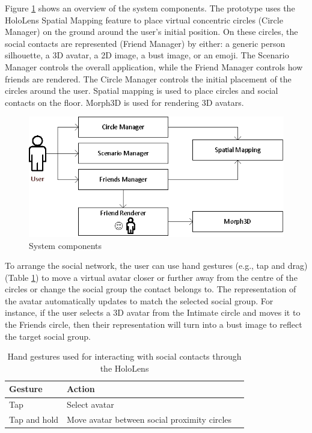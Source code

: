 Figure \ref{fig:contacts:system-diagram} shows an overview of the system components. The prototype uses the HoloLens Spatial Mapping feature to place virtual concentric circles (Circle Manager) on the ground around the user's initial position. On these circles, the social contacts are represented (Friend Manager) by either: a generic person silhouette, a 3D avatar, a 2D image, a bust image, or an emoji. The Scenario Manager controls the overall application, while the Friend Manager controls how friends are rendered. The Circle Manager controls the initial placement of the circles around the user. Spatial mapping is used to place circles and social contacts on the floor. Morph3D is used for rendering 3D avatars. 

\begin{figure}[h]
  \centering
  \includegraphics[width=0.8\linewidth]{images/41-visualising-mgia17/system-diagram.eps}
  \caption{System components}
    \label{fig:contacts:system-diagram}
\end{figure}

To arrange the social network, the user can use hand gestures (e.g., tap and drag) (Table \ref{tbl:contacts:gestures}) to move a virtual avatar closer or further away from the centre of the circles or change the social group the contact belongs to. The representation of the avatar automatically updates to match the selected social group. For instance, if the user selects a 3D avatar from the Intimate circle and moves it to the Friends circle, then their representation will turn into a bust image to reflect the target social group.

\begin{table}[h]
    \caption{Hand gestures used for interacting with social contacts through the HoloLens}
    \label{tbl:contacts:gestures}
    \centering
    \begin{tabular}{@{}lll@{}}
    \toprule
    Gesture      & Action                                       &  \\ \midrule
    Tap          & Select avatar                                &  \\
    Tap and hold & Move avatar between social proximity circles &  \\ \bottomrule
    \end{tabular}
\end{table}


